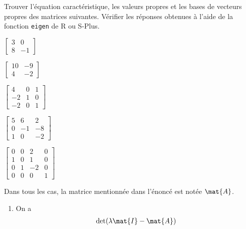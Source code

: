 \begin{exercice}
  \label{ex:valeurspropres:base}
  Trouver l'équation caractéristique, les valeurs propres et les bases
  de vecteurs propres des matrices suivantes.  Vérifier les réponses
  obtenues à l'aide de la fonction \texttt{eigen} de \textsf{R} ou
  S-Plus.
  \begin{enumerate}
    \begin{multicols}{2}
    \item $\begin{bmatrix} 3 & 0 \\ 8 & -1 \end{bmatrix}$
    \item $\begin{bmatrix} 10 & -9 \\ 4 & -2 \end{bmatrix}$
    \end{multicols}
    \begin{multicols}{2}
    \item $\begin{bmatrix}
        4 & 0 & 1 \\
        -2 & 1 & 0 \\
        -2 & 0 & 1
      \end{bmatrix}$
    \item $\begin{bmatrix}
        5 &  6 &  2 \\
        0 & -1 & -8 \\
        1 &  0 & -2
      \end{bmatrix}$
    \end{multicols}
    \begin{multicols}{2}
    \item $\begin{bmatrix}
        0 & 0 &  2 & 0 \\
        1 & 0 &  1 & 0 \\
        0 & 1 & -2 & 0 \\
        0 & 0 &  0 & 1
      \end{bmatrix}$
    \end{multicols}
  \end{enumerate}
  \begin{sol}
    Dans tous les cas, la matrice mentionnée dans l'énoncé est notée
    $\mat{A}$.
    \begin{enumerate}
    \item On a
      \begin{align*}
        \det(\lambda \mat{I} - \mat{A})

\end{align*}
\end{enumerate}
\end{sol}
\end{exercice}
